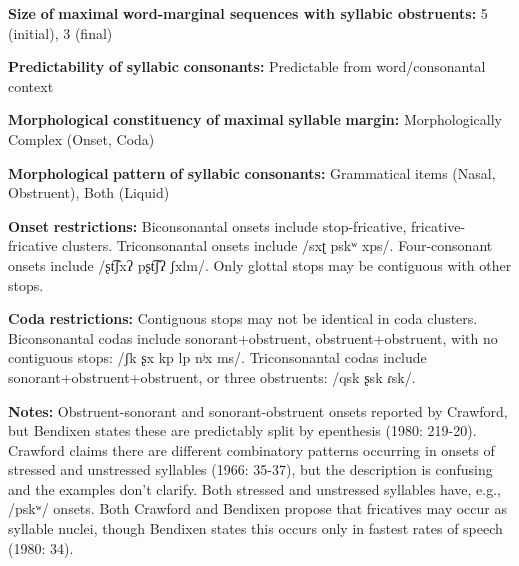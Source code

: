 \documentclass[output=paper]{langsci/langscibook}
\begin{document}
\begin{styleBody}
\textbf{Size} \textbf{of} \textbf{maximal} \textbf{word{}-marginal sequences with syllabic obstruents:} 5 (initial), 3 (final)
\end{styleBody}

\begin{styleBody}
\textbf{Predictability} \textbf{of} \textbf{syllabic} \textbf{consonants:} Predictable from word/consonantal context
\end{styleBody}

\begin{styleBody}
\textbf{Morphological} \textbf{constituency} \textbf{of} \textbf{maximal} \textbf{syllable} \textbf{margin:} Morphologically Complex (Onset, Coda)
\end{styleBody}

\begin{styleBody}
\textbf{Morphological} \textbf{pattern} \textbf{of} \textbf{syllabic} \textbf{consonants:} Grammatical items (Nasal, Obstruent), Both (Liquid)
\end{styleBody}

\begin{styleBody}
\textbf{Onset} \textbf{restrictions:} Biconsonantal onsets include stop-fricative, fricative-fricative clusters. Triconsonantal onsets include /sxʈ pskʷ xps/. Four-consonant onsets include /ʂt͡ʃxʔ pʂt͡ʃʔ ʃxlm/. Only glottal stops may be contiguous with other stops.
\end{styleBody}

\begin{styleBody}
\textbf{Coda} \textbf{restrictions:} Contiguous stops may not be identical in coda clusters. Biconsonantal codas include sonorant+obstruent, obstruent+obstruent, with no contiguous stops: /ʃk ʂx kp lp nʲx ms/. Triconsonantal codas include sonorant+obstruent+obstruent, or three obstruents: /qsk ʂsk ɾsk/.
\end{styleBody}

\begin{styleBody}
\textbf{Notes:} Obstruent-sonorant and sonorant-obstruent onsets reported by Crawford, but Bendixen states these are predictably split by epenthesis (1980: 219-20). Crawford claims there are different combinatory patterns occurring in onsets of stressed and unstressed syllables (1966: 35-37), but the description is confusing and the examples don’t clarify. Both stressed and unstressed syllables have, e.g., /pskʷ/ onsets. Both Crawford and Bendixen propose that fricatives may occur as syllable nuclei, though Bendixen states this occurs only in fastest rates of speech (1980: 34).
\end{styleBody}
\end{document}
